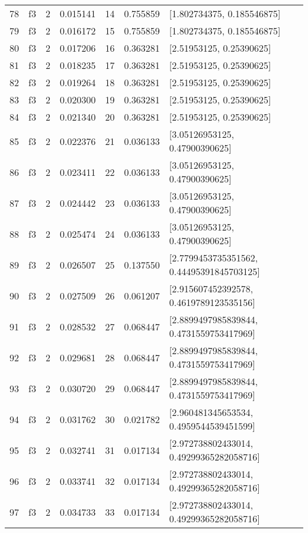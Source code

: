 \begin{tabular}{lllrlrl}
78  &  f3 &   2 &  0.015141 &   14 &  0.755859 &                 [1.802734375, 0.185546875] \\
79  &  f3 &   2 &  0.016172 &   15 &  0.755859 &                 [1.802734375, 0.185546875] \\
80  &  f3 &   2 &  0.017206 &   16 &  0.363281 &                   [2.51953125, 0.25390625] \\
81  &  f3 &   2 &  0.018235 &   17 &  0.363281 &                   [2.51953125, 0.25390625] \\
82  &  f3 &   2 &  0.019264 &   18 &  0.363281 &                   [2.51953125, 0.25390625] \\
83  &  f3 &   2 &  0.020300 &   19 &  0.363281 &                   [2.51953125, 0.25390625] \\
84  &  f3 &   2 &  0.021340 &   20 &  0.363281 &                   [2.51953125, 0.25390625] \\
85  &  f3 &   2 &  0.022376 &   21 &  0.036133 &             [3.05126953125, 0.47900390625] \\
86  &  f3 &   2 &  0.023411 &   22 &  0.036133 &             [3.05126953125, 0.47900390625] \\
87  &  f3 &   2 &  0.024442 &   23 &  0.036133 &             [3.05126953125, 0.47900390625] \\
88  &  f3 &   2 &  0.025474 &   24 &  0.036133 &             [3.05126953125, 0.47900390625] \\
89  &  f3 &   2 &  0.026507 &   25 &  0.137550 &  [2.7799453735351562, 0.44495391845703125] \\
90  &  f3 &   2 &  0.027509 &   26 &  0.061207 &    [2.915607452392578, 0.4619789123535156] \\
91  &  f3 &   2 &  0.028532 &   27 &  0.068447 &   [2.8899497985839844, 0.4731559753417969] \\
92  &  f3 &   2 &  0.029681 &   28 &  0.068447 &   [2.8899497985839844, 0.4731559753417969] \\
93  &  f3 &   2 &  0.030720 &   29 &  0.068447 &   [2.8899497985839844, 0.4731559753417969] \\
94  &  f3 &   2 &  0.031762 &   30 &  0.021782 &    [2.960481345653534, 0.4959544539451599] \\
95  &  f3 &   2 &  0.032741 &   31 &  0.017134 &   [2.972738802433014, 0.49299365282058716] \\
96  &  f3 &   2 &  0.033741 &   32 &  0.017134 &   [2.972738802433014, 0.49299365282058716] \\
97  &  f3 &   2 &  0.034733 &   33 &  0.017134 &   [2.972738802433014, 0.49299365282058716] \\

\end{tabular}
